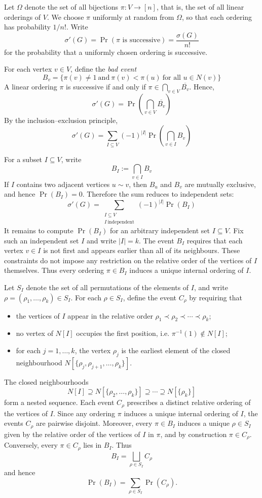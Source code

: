 \documentclass[11pt,a4paper]{article}
\numberwithin{equation}{section}
\theoremstyle{plain}
\theoremstyle{definition}
\theoremstyle{remark}
\begin{document}
Let \(\Omega\) denote the set of all bijections \(\pi:V\to[n]\), that is, the set of all linear orderings of \(V\). We choose \(\pi\) uniformly at random from \(\Omega\), so that each ordering has probability \(1/n!\).
Write
\[
\sigma'(G)=\Pr(\pi \text{ is successive})
=\frac{\sigma(G)}{n!}
\]
for the probability that a uniformly chosen ordering is successive.

For each vertex \(v\in V\), define the \emph{bad event}
\[ B_v =
\bigl\{
\pi(v)\neq 1
\ \text{and}\
\pi(v)<\pi(u)\ \text{for all }u\in N(v)
\bigr\}
\]
A linear ordering \(\pi\) is successive if and only if
\( \pi\in 
\bigcap_{v\in V} \overline{B_v}\).
Hence,
\[ \sigma'(G) =
\Pr\!\left(\bigcap_{v\in V} \overline{B_v}\right)
\]
By the inclusion--exclusion principle,
\[
\sigma'(G) = 
\sum_{I\subseteq V}
(-1)^{|I|}
\Pr\!\left(\bigcap_{v\in I} B_v\right)
\]

For a subset \(I\subseteq V\), write
\[ B_I := \bigcap_{v\in I} B_v \]
If \(I\) contains two adjacent vertices \(u\sim v\), then
\(B_u\) and \(B_v\) are mutually exclusive, and hence
\(\Pr(B_I)=0\).
Therefore the sum reduces to independent sets:
\begin{equation}
\label{eq:inc-exc}
\sigma'(G) = \sum_{\substack{I\subseteq V\\ I\ \mathrm{independent}}}
(-1)^{|I|}
\Pr(B_I)
\end{equation}
It remains to compute \(\Pr(B_I)\) for an arbitrary independent set \(I\subseteq V\).
Fix such an independent set \(I\) and write \(|I|=k\).
The event \(B_I\) requires that each vertex \(v\in I\) is not first and appears
earlier than all of its neighbours. These constraints do not impose any restriction on the relative order of the vertices of \(I\) themselves. Thus every ordering \(\pi\in B_I\) induces a unique internal ordering of \(I\).

Let \(S_I\) denote the set of all permutations of the elements of \(I\),
and write \(\rho=(\rho_1,\dots,\rho_k)\in S_I\).
For each \(\rho\in S_I\), define the event \(C_\rho\) by requiring that
\begin{itemize}
\item the vertices of \(I\) appear in the relative order
      \(\rho_1\prec\rho_2\prec\cdots\prec\rho_k\);
\item no vertex of \(N[I]\) occupies the first position, i.e.
      \(\pi^{-1}(1)\notin N[I]\);
\item for each \(j=1,\dots,k\), the vertex \(\rho_j\) is the earliest element
      of the closed neighbourhood \(N[\{\rho_j,\rho_{j+1},\dots,\rho_k\}]\).
\end{itemize}
The closed neighbourhoods
\[
N[I]\supseteq N[\{\rho_2,\dots,\rho_k\}]
\supseteq \cdots \supseteq
N[\{\rho_k\}]
\]
form a nested sequence.
Each event \(C_\rho\) prescribes a distinct relative ordering of the vertices of \(I\).
Since any ordering \(\pi\) induces a unique internal ordering of \(I\), the events
\(C_\rho\) are pairwise disjoint.
Moreover, every \(\pi\in B_I\) induces a unique \(\rho\in S_I\) given by
the relative order of the vertices of \(I\) in \(\pi\), and by construction
\(\pi\in C_\rho\). Conversely, every \(\pi\in C_\rho\) lies in \(B_I\).
Thus
\[
B_I=\bigsqcup_{\rho\in S_I} C_\rho
\]
and hence
\[
\Pr(B_I)=\sum_{\rho\in S_I}\Pr(C_\rho).
\]
\end{document}
